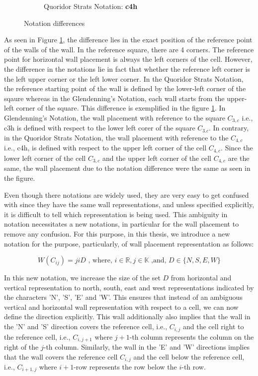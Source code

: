 \begin{figure}[!ht]
\begin{subfigure}{0.4\textwidth}
      \caption{Quoridor Strats Notation: \textbf{c4h}}
    \end{subfigure}
    \caption{Notation differences}
    \label{fig:WallNotationsDifferent}
\end{figure}

As seen in Figure \ref{fig:WallNotationsDifferent}, the difference lies in the exact position of the reference point of the walls of the wall. In the reference square, there are 4 corners. The reference point for horizontal wall placement is always the left corners of the cell. However, the difference in the notations lie in fact that whether the reference left corner is the left upper corner or the left lower corner. In the Quoridor Strats Notation, the reference starting point of the wall  is defined by the lower-left corner of the sqaure whereas in the Glendenning's Notation, each wall starts from the upper-left corner of the square. This difference is exemplified in the figure \ref{fig:WallNotationsDifferent}. In Glendenning's Notation, the wall placement with reference to the square $C_{3, c}$ i.e., c3h is defined with respect to the lower left corer of the square $C_{3. c}$. In contrary, in the Quoridor Strats Notation, the wall placement with reference to the $C_{4,c}$ i.e., c4h, is defined with respect to the upper left corner of the cell $C_{4,c}$. Since the lower left corner of the cell $C_{3,c}$ and the upper left corner of the cell $C_{4,c}$ are the same, the wall placement due to the notation difference were the same as seen in the figure.

Even though there notations are widely used, they are very easy to get confused with since they have the same wall representations,
and unless specified explicitly, it is difficult to tell which representation is being used. This ambiguity in notation necessitates a new notations, in particular for the wall placement to remove any confusion. For this purpose, in this thesis, we introduce a new notation for the purpose, particularly, of wall placement representation as follows:

\begin{equation}\label{eqn:Wall2}
W(C_{ij}) = jiD \text{ , where, } i \in \mathbb{R}, j \in \mathbb{K} \text{ ,and, } D \in \{N, S, E, W\}    
\end{equation}

In this new notation, we increase the size of the set $D$ from horizontal and vertical representation to north, south, east and west representations indicated by the characters 'N', 'S', 'E' and 'W'. This ensures that instead of an ambiguous vertical and horizontal wall representation with  respect to a cell, we can now define the direction explicitly. This wall additionally also implies that the wall in the 'N' and 'S' direction covers the reference cell, i.e., $C_{i, j}$ and the cell right to the reference cell, i.e., $C_{i, j+1}$ where $j+1$-th column represents the column on the right of the $j$-th column. Similarly, the wall in the 'E' and 'W' directions implies that the wall covers the reference cell $C_{i, j}$ and the cell below the reference cell, i.e., $C_{i+1, j}$ where $i+1$-row represents the row below the $i$-th row.

